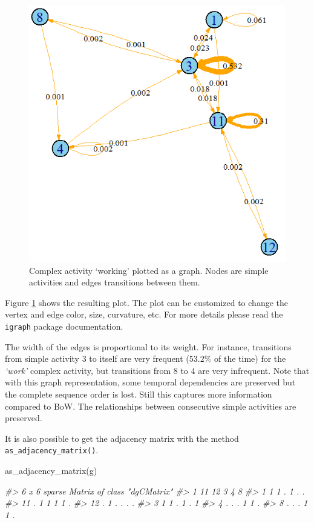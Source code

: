 \documentclass[
  11pt,
]{krantz}
\newenvironment{Shaded}{\begin{snugshade}}{\end{snugshade}}
\newcommand{\CommentTok}[1]{\textcolor[rgb]{0.37,0.37,0.37}{\textit{#1}}}
\newcommand{\FunctionTok}[1]{\textcolor[rgb]{0,0,0}{#1}}
\newcommand{\NormalTok}[1]{#1}
\begin{document}
\begin{figure}

{\centering \includegraphics[width=0.6\linewidth]{images/graph_activity} 

}

\caption{Complex activity `working' plotted as a graph. Nodes are simple activities and edges transitions between them.}\label{fig:graphActivity}
\end{figure}

Figure \ref{fig:graphActivity} shows the resulting plot. The plot can be customized to change the vertex and edge color, size, curvature, etc. For more details please read the \texttt{igraph} package documentation.

The width of the edges is proportional to its weight. For instance, transitions from simple activity \(3\) to itself are very frequent (\(53.2\%\) of the time) for the \emph{`work'} complex activity, but transitions from \(8\) to \(4\) are very infrequent. Note that with this graph representation, some temporal dependencies are preserved but the complete sequence order is lost. Still this captures more information compared to BoW. The relationships between consecutive simple activities are preserved.

It is also possible to get the adjacency matrix with the method \texttt{as\_adjacency\_matrix()}.

\begin{Shaded}
\begin{Highlighting}[]
\FunctionTok{as\_adjacency\_matrix}\NormalTok{(g)}

\CommentTok{\#\textgreater{} 6 x 6 sparse Matrix of class "dgCMatrix"}
\CommentTok{\#\textgreater{}    1 11 12 3 4 8}
\CommentTok{\#\textgreater{} 1  1  1  . 1 . .}
\CommentTok{\#\textgreater{} 11 .  1  1 1 1 .}
\CommentTok{\#\textgreater{} 12 .  1  . . . .}
\CommentTok{\#\textgreater{} 3  1  1  . 1 . 1}
\CommentTok{\#\textgreater{} 4  .  .  . 1 1 .}
\CommentTok{\#\textgreater{} 8  .  .  . 1 1 .}
\end{Highlighting}
\end{Shaded}
\end{document}
